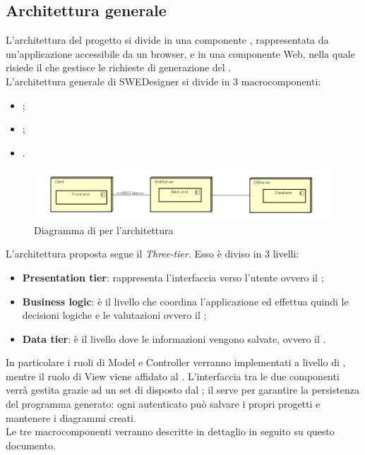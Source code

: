 	\subsection{Architettura generale}
	\label{3.2}
	L'architettura del progetto si divide in una componente , rappresentata da un'applicazione
 accessibile da un browser, e in una componente Web, nella quale risiede il  che gestisce le richieste di generazione del .\\
L'architettura generale di SWEDesigner si divide in 3 macrocomponenti:
\begin{itemize}
\item \textbf{};
\item \textbf{ };
\item \textbf{}.
\end{itemize}

 \begin{figure}[h!]
\centering
\includegraphics[scale=0.4]{Disegnetti/architetturaGenerale.png}
\caption{Diagramma di  per l'architettura}
 \end{figure}

L'architettura proposta segue il  \emph{Three-tier}. Esso è diviso in 3 livelli:
\begin{itemize}
\item \textbf{Presentation tier}: rappresenta l'interfaccia verso l'utente ovvero il ;
\item \textbf{Business logic}: è il livello che coordina l'applicazione ed effettua quindi le decisioni logiche e le valutazioni ovvero il ;
\item \textbf{Data tier}: è il livello dove le informazioni vengono salvate, ovvero il .
\end{itemize}


In particolare i ruoli di Model e Controller verranno implementati a livello di , mentre il ruolo di View viene affidato al . L'interfaccia tra le due componenti verrà gestita grazie ad un set di  disposto dal  ; il  serve per garantire la persistenza del programma generato: ogni  autenticato può salvare i propri progetti e mantenere i diagrammi creati.\\
Le tre macrocomponenti verranno descritte in dettaglio in seguito su questo documento.
